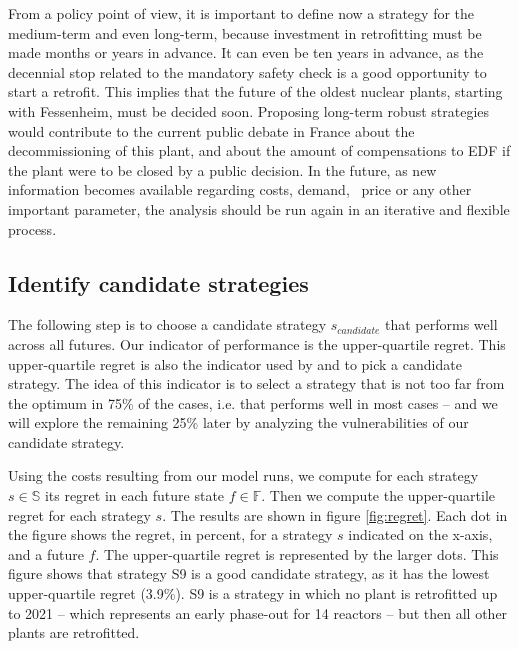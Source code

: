 From a policy point of view, it is important to define now a strategy for the medium-term and even long-term, because investment in retrofitting must be made months or years in advance. It can even be ten years in advance, as the decennial stop related to the mandatory safety check is a good opportunity to start a retrofit. 
This implies that the future of the oldest nuclear plants, starting with Fessenheim, must be decided soon. 
Proposing long-term robust strategies would contribute to the current public debate in France about the decommissioning of this plant, and about the amount of compensations to EDF if the plant were to be closed by a public decision.
In the future, as new information becomes available regarding costs, demand, \coo\ price or any other important parameter, the analysis should be run again in an iterative and flexible process.

\subsection{Identify candidate strategies}

The following step is to choose a candidate strategy $s_{candidate}$ that performs well across all futures. Our indicator of performance is the upper-quartile regret. This upper-quartile regret is also the indicator used by \citet{Lempert2006} and \citet{Nahmmacher2016} to pick a candidate strategy. The idea of this indicator is to select a strategy that is not too far from the optimum in 75\% of the cases, i.e. that performs well in most cases -- and we will explore the remaining 25\% later by analyzing the vulnerabilities of our candidate strategy. 

Using the costs resulting from our model runs, we compute for each strategy $s \in \mathbb{S}$ its regret in each future state $f \in \mathbb{F}$. Then we compute the upper-quartile regret for each strategy $s$. The results are shown in figure \ref{fig:regret}. Each dot in the figure shows the regret, in percent, for a strategy $s$ indicated on the x-axis, and a future $f$. The upper-quartile regret is represented by the larger dots. This figure shows that strategy S9 is a good candidate strategy, as it has the lowest upper-quartile regret (3.9\%). S9 is a strategy in which no plant is retrofitted up to 2021 -- which represents an early phase-out for 14 reactors -- but then all other plants are retrofitted.

